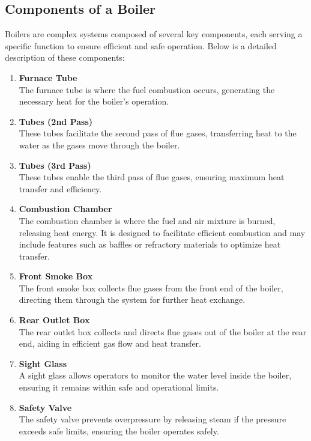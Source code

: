 \subsection{Components of a Boiler}
Boilers are complex systems composed of several key components, each serving a specific function to ensure efficient and safe operation. Below is a detailed description of these components:

\begin{enumerate}
    \item \textbf{Furnace Tube}\\
    The furnace tube is where the fuel combustion occurs, generating the necessary heat for the boiler's operation.

    \item \textbf{Tubes (2nd Pass)}\\
    These tubes facilitate the second pass of flue gases, transferring heat to the water as the gases move through the boiler.

    \item \textbf{Tubes (3rd Pass)}\\
    These tubes enable the third pass of flue gases, ensuring maximum heat transfer and efficiency.

    \item \textbf{Combustion Chamber}\\
    The combustion chamber is where the fuel and air mixture is burned, releasing heat energy. It is designed to facilitate efficient combustion and may include features such as baffles or refractory materials to optimize heat transfer.

    \item \textbf{Front Smoke Box}\\
    The front smoke box collects flue gases from the front end of the boiler, directing them through the system for further heat exchange.

    \item \textbf{Rear Outlet Box}\\
    The rear outlet box collects and directs flue gases out of the boiler at the rear end, aiding in efficient gas flow and heat transfer.

    \item \textbf{Sight Glass}\\
    A sight glass allows operators to monitor the water level inside the boiler, ensuring it remains within safe and operational limits.

    \item \textbf{Safety Valve}\\
    The safety valve prevents overpressure by releasing steam if the pressure exceeds safe limits, ensuring the boiler operates safely.


\end{enumerate}

